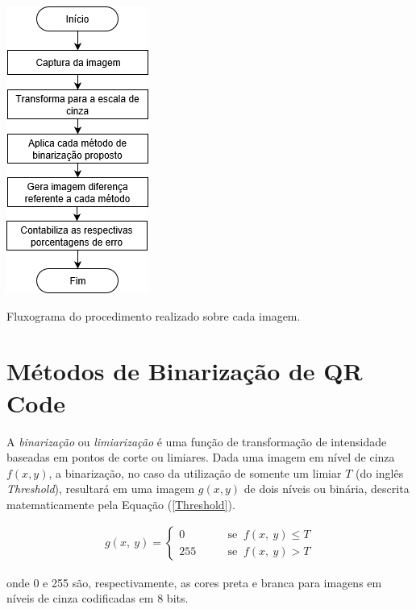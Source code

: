 \documentclass{ceel}
\begin{document}
\begin{multicols}{2}
\vspace{0.5cm}
\begin{minipage}[h]{\columnwidth}
\centering
\captionsetup{type=figure}
\includegraphics[scale=0.58]{Fluxograma}
\caption{Fluxograma do procedimento realizado sobre cada imagem.} \label{fluxograma}
\end{minipage}

\section{Métodos de Binarização de QR Code} \label{metodos}
A \emph{binarização} ou \emph{limiarização} é uma função de transformação de intensidade baseadas em pontos de corte ou limiares. Dada uma imagem em nível de cinza $f(x, y)$, a binarização, no caso da utilização de somente um limiar $T$ (do inglês \emph{Threshold}), resultará em uma imagem $g(x, y)$  de dois níveis ou binária, descrita matematicamente pela Equação (\ref{Threshold}).

\begin{gather}
g( x,\ y) =\begin{cases}
0 & \quad \quad \text{se }\ f( x,\ y) \leqslant T\\
255 & \quad \quad \text{se }\ f( x,\ y)  >T
\end{cases}
\label{Threshold}
\end{gather}
\vspace{0.1cm}

onde 0 e 255 são, respectivamente, as cores preta e branca para imagens em níveis de cinza codificadas em 8 bits.\\


\end{multicols}
\end{document}
